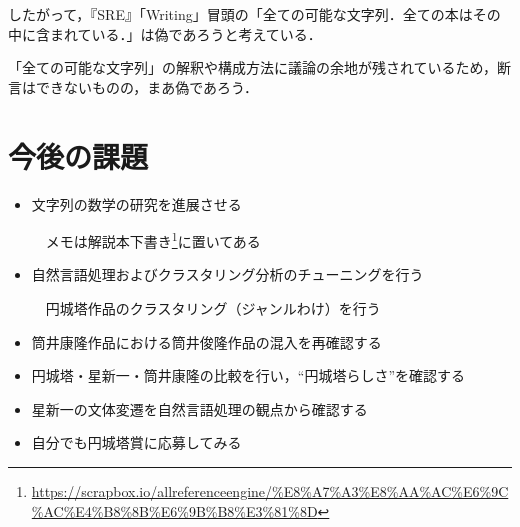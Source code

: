 \documentclass[10pt, a5paper, twoside]{jsarticle}
\theoremstyle{definition}
\begin{document}
		したがって，『SRE』「Writing」冒頭の「全ての可能な文字列．全ての本はその中に含まれている．」は偽であろうと考えている．

		「全ての可能な文字列」の解釈や構成方法に議論の余地が残されているため，断言はできないものの，まあ偽であろう．

	\section{今後の課題}

		\begin{itemize}

			\item 文字列の数学の研究を進展させる

			\vspace{1mm}

			　メモは解説本下書き\footnote{\url{https://scrapbox.io/allreferenceengine/%E8%A7%A3%E8%AA%AC%E6%9C%AC%E4%B8%8B%E6%9B%B8%E3%81%8D}}に置いてある

			\vspace{2mm}

			\item 自然言語処理およびクラスタリング分析のチューニングを行う

			\vspace{1mm}

			　円城塔作品のクラスタリング（ジャンルわけ）を行う

			\item 筒井康隆作品における筒井俊隆作品の混入を再確認する

			\vspace{2mm}

			\item 円城塔・星新一・筒井康隆の比較を行い，“円城塔らしさ”を確認する

			\vspace{2mm}

			\item 星新一の文体変遷を自然言語処理の観点から確認する

			\vspace{2mm}

			\item 自分でも円城塔賞に応募してみる

		\end{itemize}
\end{document}
